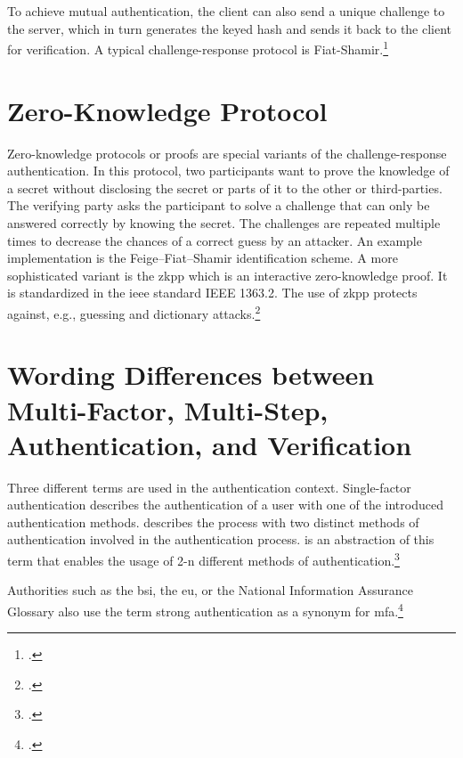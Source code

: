 To achieve mutual authentication, the client can also send a unique challenge to the server, which in turn generates the keyed hash and sends it back to the client for verification. A typical challenge-response protocol is Fiat-Shamir.\footcites[See][Chapter 13.6]{waschke2017personal}[See][489--491]{eckert-it-sec-9}

\section{Zero-Knowledge Protocol}

Zero-knowledge protocols or proofs are special variants of the challenge-response authentication. In this protocol, two participants want to prove the knowledge of a secret without disclosing the secret or parts of it to the other or third-parties. The verifying party asks the participant to solve a challenge that can only be answered correctly by knowing the secret. The challenges are repeated multiple times to decrease the chances of a correct guess by an attacker. An example implementation is the Feige–Fiat–Shamir identification scheme. A more sophisticated variant is the \gls{zkpp} which is an interactive zero-knowledge proof. It is standardized in the \gls{ieee} standard IEEE 1363.2. The use of \gls{zkpp} protects against, e.g., guessing and dictionary attacks.\footcites[See][492]{eckert-it-sec-9}[See][Chapter 28.3.7]{1174011}[See][769--770]{FISCHERHBNER2017759}[See][]{Feige1988}

\section{Wording Differences between Multi-Factor, Multi-Step, Authentication, and Verification}

Three different terms are used in the authentication context. Single-factor authentication describes the authentication of a user with one of the introduced authentication methods.  describes the process with two distinct methods of authentication involved in the authentication process.  is an abstraction of this term that enables the usage of 2-n different methods of authentication.\footcites[See][186--188]{dasgupta2017multi}

Authorities such as the \gls{bsi}, the \gls{eu}, or the National Information Assurance Glossary also use the term \frqq strong authentication\flqq{} as a synonym for \gls{mfa}.\footcites[See][117]{CNSS4009}[See][11]{deutschland2018grundschutz}

